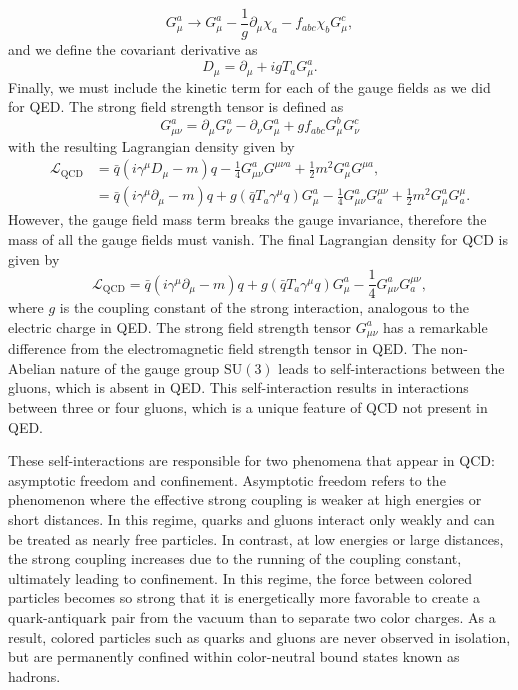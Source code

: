 \begin{equation}
  G_{\mu}^{a} \to G_{\mu}^{a} - \frac{1}{g} \partial_{\mu}\chi_{a} - f_{abc}\chi_{b}G_{\mu}^{c},
\end{equation}
and we define the covariant derivative as
\begin{equation}
  D_{\mu} = \partial_{\mu} + ig T_{a}G_{\mu}^{a}.
  \label{eq:qcd_covariant_derivative}
\end{equation}
Finally, we must include the kinetic term for each of the gauge fields as we did for QED\@. The strong field strength tensor is defined as
\begin{equation}
  G_{\mu\nu}^{a} = \partial_{\mu}G_{\nu}^{a} - \partial_{\nu}G_{\mu}^{a} + g f_{abc}G_{\mu}^{b}G_{\nu}^{c}
  \label{eq:qcd_field_strength_tensor}
\end{equation}
with the resulting Lagrangian density given by
\begin{align}
  \mathcal{L}_{\mathrm{QCD}} &= \bar{q}(i\gamma^{\mu}D_{\mu} - m)q - \frac{1}{4}G_{\mu\nu}^{a}G^{\mu\nu a} + \frac{1}{2}m^2G_{\mu}^{a}G^{\mu a}, \nonumber \nonumber \\
  &= \bar{q}(i\gamma^{\mu}\partial_{\mu} - m)q + g(\bar{q}T_{a}\gamma^{\mu}q)G_{\mu}^{a} - \frac{1}{4}G_{\mu\nu}^{a}G_{a}^{\mu\nu} + \frac{1}{2}m^{2}G_{\mu}^{a}G_{a}^{\mu}.
  \label{eq:qcd_lagrangian}
\end{align}
However, the gauge field mass term breaks the gauge invariance, therefore the mass of all the gauge fields must vanish. The final Lagrangian density for QCD is given by
\begin{equation}
  \mathcal{L}_{\mathrm{QCD}} = \bar{q}(i\gamma^{\mu}\partial_{\mu} - m)q + g(\bar{q}T_{a}\gamma^{\mu}q)G_{\mu}^{a} - \frac{1}{4}G_{\mu\nu}^{a}G_{a}^{\mu\nu},
  \label{eq:qcd_lagrangian_final}
\end{equation}
where $g$ is the coupling constant of the strong interaction, analogous to the electric charge in QED\@. The strong field strength tensor $G_{\mu\nu}^{a}$ has a remarkable difference from the electromagnetic field strength tensor in QED\@. The non-Abelian nature of the gauge group $\mathrm{SU}(3)$ leads to self-interactions between the gluons, which is absent in QED\@. This self-interaction results in interactions between three or four gluons, which is a unique feature of QCD not present in QED\@.

These self-interactions are responsible for two phenomena that appear in QCD: asymptotic freedom and confinement. Asymptotic freedom refers to the phenomenon where the effective strong coupling is weaker at high energies or short distances. In this regime, quarks and gluons interact only weakly and can be treated as nearly free particles. In contrast, at low energies or large distances, the strong coupling increases due to the running of the coupling constant, ultimately leading to confinement. In this regime, the force between colored particles becomes so strong that it is energetically more favorable to create a quark-antiquark pair from the vacuum than to separate two color charges. As a result, colored particles such as quarks and gluons are never observed in isolation, but are permanently confined within color-neutral bound states known as hadrons.
